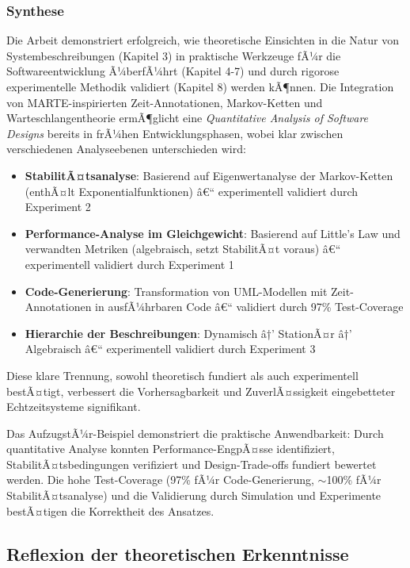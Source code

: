 ﻿\documentclass[a4paper,12pt]{scrreprt}
\theoremstyle{definition}
\begin{document}
\subsubsection{Synthese}

Die Arbeit demonstriert erfolgreich, wie theoretische Einsichten in die Natur von Systembeschreibungen (Kapitel 3) in praktische Werkzeuge fÃ¼r die Softwareentwicklung Ã¼berfÃ¼hrt (Kapitel 4-7) und durch rigorose experimentelle Methodik validiert (Kapitel 8) werden kÃ¶nnen. Die Integration von MARTE-inspirierten Zeit-Annotationen, Markov-Ketten und Warteschlangentheorie ermÃ¶glicht eine \textit{Quantitative Analysis of Software Designs} bereits in frÃ¼hen Entwicklungsphasen, wobei klar zwischen verschiedenen Analyseebenen unterschieden wird:

\begin{itemize}
	\item[-] \textbf{StabilitÃ¤tsanalyse}: Basierend auf Eigenwertanalyse der Markov-Ketten (enthÃ¤lt Exponentialfunktionen) â€“ experimentell validiert durch Experiment 2
	\item[-] \textbf{Performance-Analyse im Gleichgewicht}: Basierend auf Little's Law und verwandten Metriken (algebraisch, setzt StabilitÃ¤t voraus) â€“ experimentell validiert durch Experiment 1
	\item[-] \textbf{Code-Generierung}: Transformation von UML-Modellen mit Zeit-Annotationen in ausfÃ¼hrbaren Code â€“ validiert durch 97\% Test-Coverage
	\item[-] \textbf{Hierarchie der Beschreibungen}: Dynamisch â†’ StationÃ¤r â†’ Algebraisch â€“ experimentell validiert durch Experiment 3
\end{itemize}

Diese klare Trennung, sowohl theoretisch fundiert als auch experimentell bestÃ¤tigt, verbessert die Vorhersagbarkeit und ZuverlÃ¤ssigkeit eingebetteter Echtzeitsysteme signifikant.

Das AufzugstÃ¼r-Beispiel demonstriert die praktische Anwendbarkeit: Durch quantitative Analyse konnten Performance-EngpÃ¤sse identifiziert, StabilitÃ¤tsbedingungen verifiziert und Design-Trade-offs fundiert bewertet werden. Die hohe Test-Coverage (97\% fÃ¼r Code-Generierung, $\sim$100\% fÃ¼r StabilitÃ¤tsanalyse) und die Validierung durch Simulation und Experimente bestÃ¤tigen die Korrektheit des Ansatzes.

\subsection{Reflexion der theoretischen Erkenntnisse}
\end{document}
